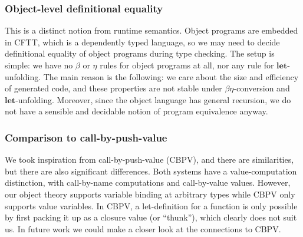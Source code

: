 \documentclass[acmsmall,screen,review,anonymous]{acmart}
\newcommand{\mbf}[1]{{\mathbf{#1}}}
\theoremstyle{remark}
\begin{document}
\subsubsection{Object-level definitional equality} This is a distinct notion
from runtime semantics. Object programs are embedded in CFTT, which is a
dependently typed language, so we may need to decide definitional equality of
object programs during type checking. The setup is simple: we have no $\beta$ or
$\eta$ rules for object programs at all, nor any rule for $\mbf{let}$-unfolding.
The main reason is the following: we care about the size and efficiency of
generated code, and these properties are not stable under $\beta\eta$-conversion
and $\mbf{let}$-unfolding. Moreover, since the object language has general
recursion, we do not have a sensible and decidable notion of program equivalence
anyway.

\subsubsection{Comparison to call-by-push-value}
We took inspiration from call-by-push-value (CBPV), and there are similarities,
but there are also significant differences. Both systems have a
value-computation distinction, with call-by-name computations and call-by-value
values. However, our object theory supports variable binding at arbitrary types
while CBPV only supports value variables. In CBPV, a let-definition for a
function is only possible by first packing it up as a closure value (or
``thunk''), which clearly does not suit us. In future work we could make
a closer look at the connections to CBPV.


\end{document}
